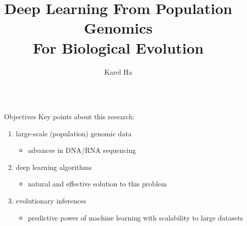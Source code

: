 \documentclass[final,hyperref={pdfpagelabels=false}]{beamer}
\title{\huge Deep Learning
From Population Genomics \\
For Biological Evolution} %
\author{Karel Ha} %
\institute{
Life Sciences -- Faculty of Natural Sciences\\
Imperial College London} %
\begin{document}

\begin{frame}[t] %

\begin{columns}[t] %

\begin{column}{.02\textwidth}\end{column} %

\begin{column}{.465\textwidth} %


\begin{block}{Objectives}
Key points about this research:
\begin{enumerate}
    \item large-scale (population) genomic data
    \begin{itemize}
        \item advances in DNA/RNA sequencing
    \end{itemize}
    
    \item deep learning algorithms
    \begin{itemize}
        \item natural and effective solution to this problem
    \end{itemize}
    
    \item evolutionary inferences
    \begin{itemize}
        \item  predictive power of machine learning with scalability to large datasets
    \end{itemize}
\end{enumerate}

\end{block}

            

\end{column}
\end{columns}
\end{frame}
\end{document}
